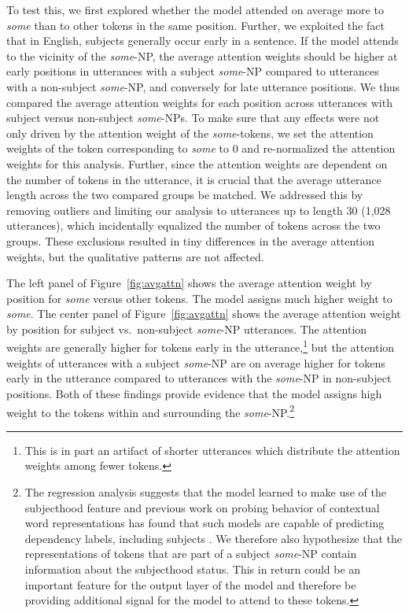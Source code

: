 \documentclass[11pt,a4paper]{article}
\newcommand{\figref}[1]{Figure~\ref{#1}}
\begin{document}
To test this, we first explored whether the model attended on average more to \emph{some} than to other tokens in the same position. Further, we exploited the fact that in English, subjects generally occur early in a sentence. If the model attends to the vicinity of the \emph{some}-NP, the average attention weights should be higher at early positions in utterances with a subject \emph{some}-NP compared to utterances with a non-subject  \emph{some}-NP, and conversely for late utterance positions. We thus compared the average attention weights for each position across utterances with subject versus non-subject \emph{some}-NPs.   To make sure that any effects were not only driven by the attention weight of the \textit{some}-tokens, we set the attention weights of the token corresponding to \textit{some} to $0$ and re-normalized the attention weights for this analysis. Further, since the attention weights are dependent on the number of tokens in the utterance, it is crucial that the average utterance length across the two compared groups be matched. We addressed this by removing outliers and limiting our analysis to utterances up to length 30 (1,028 utterances), which incidentally equalized the number of tokens across the two groups. These exclusions resulted in tiny differences in the average attention weights, but the qualitative patterns are not affected.

The left panel of \figref{fig:avgattn} shows the average attention weight by position for \emph{some} versus other tokens. The model assigns much higher weight to \emph{some}. The center panel of \figref{fig:avgattn} shows the average attention weight by position for subject vs.~non-subject  \emph{some}-NP utterances. The attention weights are generally higher for tokens early in the utterance,\footnote{This is in part an artifact of shorter utterances which distribute the attention weights among fewer tokens.} but the attention weights of utterances with a subject \textit{some}-NP are on average higher for tokens early in the utterance compared to utterances with the \textit{some}-NP in non-subject positions. Both of these findings provide evidence that the model assigns high weight to the tokens within and surrounding the \textit{some}-NP.\footnote{The regression analysis suggests that the model learned to make use of the subjecthood feature and previous work on probing behavior of contextual word representations has found that such models are capable of predicting dependency labels, including subjects \citep[e.g.,][]{liu2019}. We therefore also hypothesize that the representations of tokens that are part of a subject \textit{some}-NP contain information about the subjecthood status. This in return could be an important feature for the output layer of the model and therefore be providing additional signal for the model to attend to these tokens.}
\end{document}
